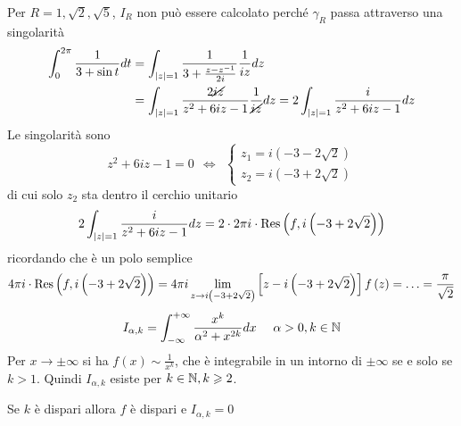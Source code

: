 Per $R = 1,\sqrt{2} ,\sqrt{5}$, $I_{R}$ non può essere calcolato perché $\gamma _{R}$ passa attraverso una singolarità
\Soluzione
\begin{align*}
\int ^{2\pi }_{0}\frac{1}{3 + \sin t} dt & = \int _{\left| z\right| = 1}\frac{1}{3 + \frac{z - z^{ - 1}}{2i}}\frac{1}{iz} dz\\
 & = \int _{\left| z\right| = 1}\frac{2\cancel{iz}}{z^{2} + 6iz - 1}\frac{1}{\cancel{iz}} dz = 2\int _{\left| z\right| = 1}\frac{i}{z^{2} + 6iz - 1} dz
\end{align*}
Le singolarità sono
\begin{equation*}
z^{2} + 6iz - 1 = 0\ \ \iff \ \ \begin{cases}
z_{1} = i\left(- 3 - 2\sqrt{2}\right)\\
z_{2} = i\left(- 3 + 2\sqrt{2}\right)
\end{cases}
\end{equation*}
di cui solo $z_{2}$ sta dentro il cerchio unitario
\begin{equation*}
2\int _{\left| z\right| = 1}\frac{i}{z^{2} + 6iz - 1} dz = 2\cdot 2\pi i\cdot \operatorname{Res} \left(f,i\left(- 3 + 2\sqrt{2}\right)\right)
\end{equation*}
ricordando che è un polo semplice
\begin{equation*}
4\pi i\cdot \operatorname{Res} \left(f,i\left(- 3 + 2\sqrt{2}\right)\right) = 4\pi i\lim\limits _{z\rightarrow i\left(- 3 + 2\sqrt{2}\right)}\left[ z - i\left(- 3 + 2\sqrt{2}\right)\right] f\left(z\right) = \dotsc = \frac{\pi }{\sqrt{2}}
\end{equation*}
\Soluzione
\begin{equation*}
I_{\alpha ,k} = \int ^{ + \infty }_{ - \infty }\frac{x^{k}}{\alpha ^{2} + x^{2k}} dx\ \ \ \ \alpha  > 0,k\in \NN 
\end{equation*}
Per $x\rightarrow \pm \infty $ si ha $f\left(x\right) \sim \frac{1}{x^{k}}$, che è integrabile in un intorno di $\pm \infty $ se e solo se $k > 1$. Quindi $I_{\alpha ,k}$ esiste per $k\in \mathbb{N}  ,k\geqslant 2$.

Se $k$ è dispari allora $f$ è dispari e $I_{\alpha ,k} = 0$

